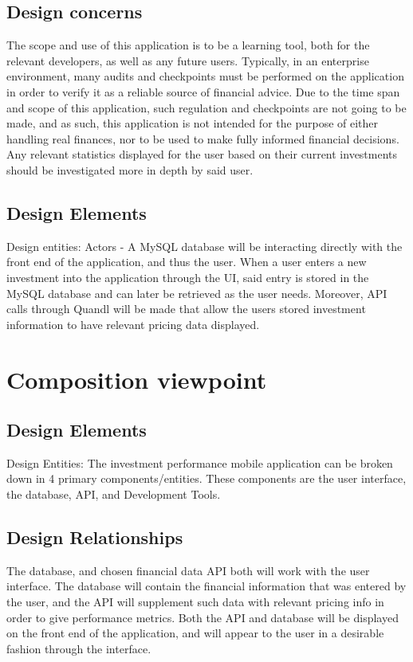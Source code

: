 \documentclass[onecolumn, draftclsnofoot,10pt, compsoc]{IEEEtran}
\begin{document}
\subsection{Design concerns}
        The scope and use of this application is to be a learning tool, both for the relevant developers, as well as any future users. Typically, in an enterprise environment, many audits and
        checkpoints must be performed on the application in order to verify it as a reliable source of financial advice. Due to the time span and scope of this application, such regulation and
        checkpoints are not going to be made, and as such, this application is not intended for the purpose of either handling real finances, nor to be used to make fully informed financial decisions.
        Any relevant statistics displayed for the user based on their current investments should be investigated more in depth by said user.

\subsection{Design Elements}
        Design entities: Actors - A MySQL database will be interacting directly with the front end of the application, and thus the user. When a user enters a new investment into the application
        through the UI, said entry is stored in the MySQL database and can later be retrieved as the user needs. Moreover, API calls through Quandl will be made that allow the users stored investment
        information to have relevant pricing data displayed.

\section{Composition viewpoint}
\subsection{Design Elements}
        Design Entities: The investment performance mobile application can be broken down in 4 primary components/entities. These components are the user interface, the database, API, and Development Tools.

\subsection{Design Relationships}
        The database, and chosen financial data API both will work with the user interface. The database will contain the financial information that was entered by the user, and the API will
        supplement such data with relevant pricing info in order to give performance metrics. Both the API and database will be displayed on the front end of the application, and will appear
        to the user in a desirable fashion through the interface.
\end{document}
